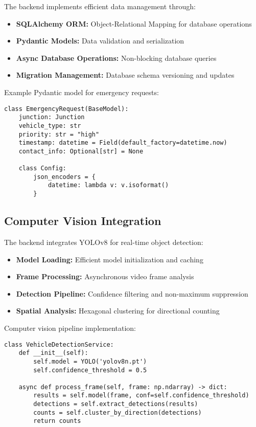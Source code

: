 \documentclass[conference]{IEEEtran}
\begin{document}
The backend implements efficient data management through:
\begin{itemize}
\item \textbf{SQLAlchemy ORM:} Object-Relational Mapping for database operations
\item \textbf{Pydantic Models:} Data validation and serialization
\item \textbf{Async Database Operations:} Non-blocking database queries
\item \textbf{Migration Management:} Database schema versioning and updates
\end{itemize}

Example Pydantic model for emergency requests:
\begin{verbatim}
class EmergencyRequest(BaseModel):
    junction: Junction
    vehicle_type: str
    priority: str = "high"
    timestamp: datetime = Field(default_factory=datetime.now)
    contact_info: Optional[str] = None
    
    class Config:
        json_encoders = {
            datetime: lambda v: v.isoformat()
        }
\end{verbatim}

\subsection{Computer Vision Integration}

The backend integrates YOLOv8 for real-time object detection:
\begin{itemize}
\item \textbf{Model Loading:} Efficient model initialization and caching
\item \textbf{Frame Processing:} Asynchronous video frame analysis
\item \textbf{Detection Pipeline:} Confidence filtering and non-maximum suppression
\item \textbf{Spatial Analysis:} Hexagonal clustering for directional counting
\end{itemize}

Computer vision pipeline implementation:
\begin{verbatim}
class VehicleDetectionService:
    def __init__(self):
        self.model = YOLO('yolov8n.pt')
        self.confidence_threshold = 0.5
        
    async def process_frame(self, frame: np.ndarray) -> dict:
        results = self.model(frame, conf=self.confidence_threshold)
        detections = self.extract_detections(results)
        counts = self.cluster_by_direction(detections)
        return counts
\end{verbatim}
\end{document}
